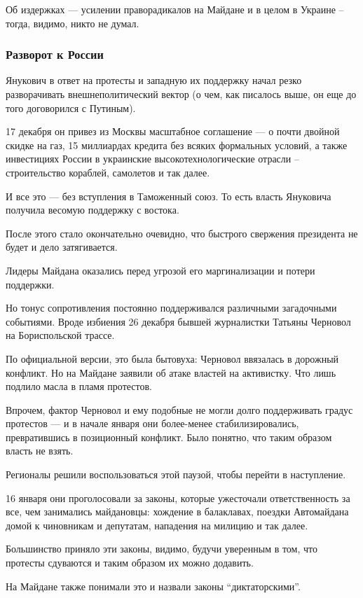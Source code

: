 Об издержках --- усилении праворадикалов на Майдане и в целом в Украине –
тогда, видимо, никто не думал.  

\subsubsection{Разворот к России }

Янукович в ответ на протесты и западную их поддержку начал резко
разворачивать внешнеполитический вектор (о чем, как писалось выше, он еще
до того договорился с Путиным).

17 декабря он привез из Москвы масштабное соглашение --- о почти двойной
скидке на газ, 15 миллиардах кредита без всяких формальных условий, а
также инвестициях России в украинские высокотехнологические отрасли –
строительство кораблей, самолетов и так далее. 

И все это --- без вступления в Таможенный союз. То есть власть Януковича
получила весомую поддержку с востока.

После этого стало окончательно очевидно, что быстрого свержения президента
не будет и дело затягивается.

Лидеры Майдана оказались перед угрозой его маргинализации и потери
поддержки.

Но тонус сопротивления постоянно поддерживался различными загадочными
событиями. Вроде избиения 26 декабря бывшей журналистки Татьяны Черновол
на Бориспольской трассе.

По официальной версии, это была бытовуха: Черновол ввязалась в дорожный
конфликт. Но на Майдане заявили об атаке властей на активистку. Что лишь
подлило масла в пламя протестов. 

Впрочем, фактор Черновол и ему подобные не могли долго поддерживать градус
протестов --- и в начале января они более-менее стабилизировались,
превратившись в позиционный конфликт. Было понятно, что таким образом
власть не взять.

Регионалы решили воспользоваться этой паузой, чтобы перейти в наступление.

16 января они проголосовали за законы, которые ужесточали ответственность
за все, чем занимались майдановцы: хождение в балаклавах, поездки
Автомайдана домой к чиновникам и депутатам, нападения на милицию и так
далее. 

Большинство приняло эти законы, видимо, будучи уверенным в том, что
протесты сдуваются и таким образом их можно додавить.

На Майдане также понимали это и назвали законы \enquote{диктаторскими}. 

